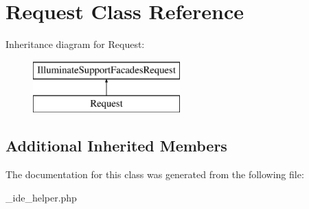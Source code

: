 \hypertarget{class_request}{}\section{Request Class Reference}
\label{class_request}
Inheritance diagram for Request\+:\begin{figure}[H]
\begin{center}
\leavevmode
\includegraphics[height=2.000000cm]{class_request}
\end{center}
\end{figure}
\subsection*{Additional Inherited Members}


The documentation for this class was generated from the following file\+:\begin{DoxyCompactItemize}
\item 
\+\_\+ide\+\_\+helper.\+php\end{DoxyCompactItemize}
